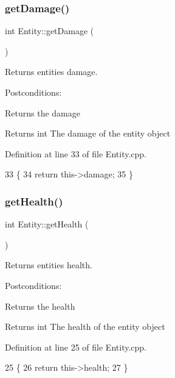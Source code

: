 \subsubsection{\texorpdfstring{get\+Damage()}{getDamage()}}
{\footnotesize\ttfamily int Entity\+::get\+Damage (\begin{DoxyParamCaption}{ }\end{DoxyParamCaption})}



Returns entities damage. 

Postconditions\+:
\begin{DoxyItemize}
\item Returns the damage
\end{DoxyItemize}

\begin{DoxyReturn}{Returns}
int The damage of the entity object 
\end{DoxyReturn}


Definition at line 33 of file Entity.\+cpp.


\begin{DoxyCode}
33                       \{
34     \textcolor{keywordflow}{return} this->damage;
35 \}
\end{DoxyCode}
\mbox{\label{classEntity_a2b0140ae8c77c0e3654b070ee3c7fe57}} 
\subsubsection{\texorpdfstring{get\+Health()}{getHealth()}}
{\footnotesize\ttfamily int Entity\+::get\+Health (\begin{DoxyParamCaption}{ }\end{DoxyParamCaption})}



Returns entities health. 

Postconditions\+:
\begin{DoxyItemize}
\item Returns the health
\end{DoxyItemize}

\begin{DoxyReturn}{Returns}
int The health of the entity object 
\end{DoxyReturn}


Definition at line 25 of file Entity.\+cpp.


\begin{DoxyCode}
25                       \{
26     \textcolor{keywordflow}{return} this->health;
27 \}
\end{DoxyCode}
\mbox{\label{classEntity_a3a9c9e298bfc47b726a2d9ce44dd7464}} 
